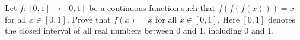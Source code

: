 Let $f : [0, 1] \to [0, 1]$ be a continuous function such that $f(f(f(x))) = x$
for all $x \in [0, 1]$. Prove that $f(x) = x$ for all $x \in [0, 1]$. Here $[0,
1]$ denotes the closed interval of all real numbers between 0 and 1, including
0 and 1.
